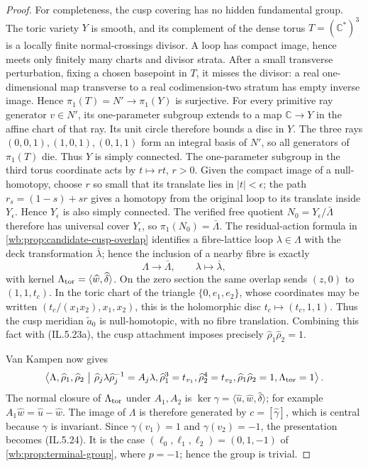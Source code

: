 \begin{proof}
For completeness, the cusp covering has no hidden fundamental group.
The toric variety $Y$ is smooth, and its complement of the dense torus
$T=(\mathbb C^*)^3$ is a locally finite normal-crossings divisor. A loop
has compact image, hence meets only finitely many charts and divisor strata.
After a small transverse perturbation, fixing a chosen basepoint in $T$,
it misses the divisor: a real one-dimensional map transverse to a real
codimension-two stratum has empty inverse image. Hence
$\pi_1(T)=N'\to\pi_1(Y)$ is surjective. For every primitive ray generator
$v\in N'$, its one-parameter subgroup extends to a map
$\mathbb C\to Y$ in the affine chart of that ray. Its unit circle therefore
bounds a disc in $Y$. The three rays
$(0,0,1),(1,0,1),(0,1,1)$ form an integral basis of $N'$, so all generators
of $\pi_1(T)$ die. Thus $Y$ is simply connected.  The one-parameter subgroup in
the third torus coordinate acts by \(t\mapsto r t\), \(r>0\).  Given the
compact image of a null-homotopy, choose \(r\) so small that its translate
lies in \(|t|<\epsilon\); the path \(r_s=(1-s)+sr\) gives a homotopy from the
original loop to its translate inside \(Y_\epsilon\).  Hence
\(Y_\epsilon\) is also simply connected.  The verified free quotient
\(N_0=Y_\epsilon/\bar\Lambda\) therefore has universal cover
\(Y_\epsilon\), so
\(\pi_1(N_0)=\bar\Lambda\).  The residual-action formula in \cref{wb:prop:candidate-cusp-overlap} identifies a fibre-lattice
loop \(\lambda\in\Lambda\) with the deck transformation
\(\bar\lambda\); hence the inclusion of a nearby fibre is exactly
\[
 \Lambda\longrightarrow\bar\Lambda,\qquad
 \lambda\longmapsto\bar\lambda,
\tag{IL.5.23c}
\]
with kernel
\(\Lambda_{\rm tor}=\langle\widehat w,\widehat\delta\rangle\).
On the zero section the same overlap sends \((z,0)\) to
\((1,1,t_c)\).  In the toric chart of the triangle
\(\{0,e_1,e_2\}\), whose coordinates may be written
\((t_c/(x_1x_2),x_1,x_2)\), this is the holomorphic disc
\(t_c\mapsto(t_c,1,1)\).  Thus the cusp meridian
\(\widetilde a_0\) is null-homotopic, with no fibre translation.  Combining
this fact with (IL.5.23a), the cusp attachment imposes precisely
\(\widehat\rho_1\widehat\rho_2=1\).

Van Kampen now gives
\[
\left\langle\Lambda,\widehat\rho_1,\widehat\rho_2\ \middle|\
\widehat\rho_j\lambda\widehat\rho_j^{-1}=A_j\lambda,
\widehat\rho_1^3=t_{v_1},\widehat\rho_2^4=t_{v_2},
\widehat\rho_1\widehat\rho_2=1,
\Lambda_{\rm tor}=1\right\rangle.
\]
The normal closure of \(\Lambda_{\rm tor}\) under \(A_1,A_2\) is
\(\ker\gamma=\langle\widehat u,\widehat w,\widehat\delta\rangle\); for
example \(A_1\widehat w=\widehat u-\widehat w\).  The image of \(\Lambda\)
is therefore generated by \(c=[\widehat\gamma]\), which is central because
\(\gamma\) is invariant.  Since \(\gamma(v_1)=1\) and
\(\gamma(v_2)=-1\), the presentation becomes (IL.5.24).  It is the case
\((\ell_0,\ell_1,\ell_2)=(0,1,-1)\) of
\cref{wb:prop:terminal-group}, where \(p=-1\); hence the group is trivial.
\end{proof}


